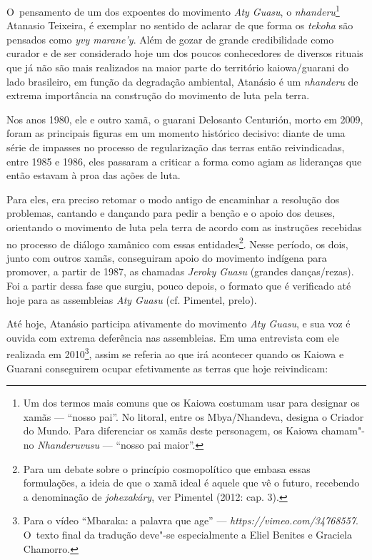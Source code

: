 O~pensamento de um dos expoentes do movimento \emph{Aty Guasu}, o
\emph{nhanderu}\footnote{Um dos termos mais comuns que os Kaiowa costumam usar
para designar os xamãs --- ``nosso pai''. No litoral, entre os
Mbya/Nhandeva, designa o Criador do Mundo. Para diferenciar os xamãs
deste personagem, os Kaiowa chamam"-no \emph{Nhanderuvusu} --- ``nosso pai
maior''.} Atanasio Teixeira, é exemplar no sentido de aclarar de que
forma os \emph{tekoha} são pensados como \emph{yvy marane’y}. Além de gozar de grande
credibilidade como curador e de ser considerado hoje um dos poucos
conhecedores de diversos rituais que já não são mais realizados na
maior parte do território kaiowa/guarani do lado brasileiro, em função
da degradação ambiental, Atanásio é um \emph{nhanderu} de extrema importância
na construção do movimento de luta pela terra. 

Nos anos 1980, ele e outro xamã, o guarani Delosanto Centurión, morto em
2009, foram as principais figuras em um momento histórico decisivo:
diante de uma série de impasses no processo de regularização das terras
então reivindicadas, entre 1985 e 1986, eles passaram a criticar a
forma como agiam as lideranças que então estavam à proa das ações de
luta.

Para eles, era preciso retomar o modo antigo de encaminhar a resolução
dos problemas, cantando e dançando para pedir a benção e o apoio dos
deuses, orientando o movimento de luta pela terra de acordo com as
instruções recebidas no processo de diálogo xamânico com essas
entidades\footnote{Para um debate sobre o princípio cosmopolítico que
embasa essas formulações, a ideia de que o xamã ideal é aquele que vê o
futuro, recebendo a denominação de \emph{johexakáry}, ver Pimentel (2012: cap.
3).}. Nesse período, os dois, junto com outros xamãs, conseguiram apoio
do movimento indígena para promover, a partir de 1987, as chamadas
\emph{Jeroky Guasu} (grandes danças/rezas). Foi a partir dessa fase que
surgiu, pouco depois, o formato que é verificado até hoje para as
assembleias \emph{Aty Guasu} (cf. Pimentel, prelo).

Até hoje, Atanásio participa ativamente do movimento \emph{Aty Guasu}, e sua
voz é ouvida com extrema deferência nas assembleias. Em uma entrevista
com ele realizada em 2010\footnote{Para o vídeo ``Mbaraka: a palavra que
age'' --- \emph{https://vimeo.com/34768557}. O~texto
final da tradução deve"-se especialmente a Eliel Benites e Graciela
Chamorro.}, assim se referia ao que irá acontecer quando os Kaiowa e
Guarani conseguirem ocupar efetivamente as terras que hoje reivindicam:

